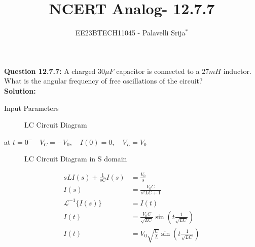 \documentclass[journal,12pt,twocolumn]{IEEEtran}
\theoremstyle{remark}
\begin{document}

\vspace{3cm}

\title{NCERT Analog- 12.7.7}
\author{EE23BTECH11045 - Palavelli Srija$^{*}$}

\maketitle

\bigskip

\renewcommand{\thefigure}{\theenumi}
\renewcommand{\thetable}{\theenumi}

\vspace{3cm}
\textbf{Question 12.7.7:} 
 A charged $30 \mu F$ capacitor is connected to a $27 mH$ inductor. What is the angular frequency of free oscillations of the circuit?\\
\textbf{Solution: }
\fi
\begin{table}[h!]
    \centering
    
    \caption{Input Parameters}
    \label{tab:table_omega}
\end{table}
\begin{figure}[H]
    \centering
    
    \caption{LC Circuit Diagram}
    \label{fig:sr33}
\end{figure}
at $t=0^-\quad V_C=-V_0,\quad I(0)=0,\quad V_L=V_0$\\

\begin{figure}[H]
    \centering
    
   \caption{LC Circuit Diagram in S domain}
    \label{fig:sr32}
\end{figure}
\begin{align}
sL I(s) + \frac{1}{sC} I(s) &= \frac{V_0}{s} \\
I(s) &= \frac{V_0C}{s^2LC + 1} \\
\mathcal{L}^{-1}\{I(s)\} &= I(t) \\
I(t) &= \frac{V_0C}{\sqrt{LC}} \sin\left(t\frac{1}{\sqrt{LC}}\right) \\
I(t) &= V_0\sqrt{\frac{C}{L}} \sin\left(t\frac{1}{\sqrt{LC}}\right)
\end{align}
\end{document}
